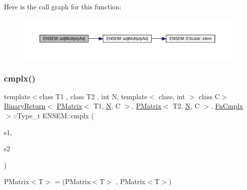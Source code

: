 Here is the call graph for this function\+:\nopagebreak
\begin{figure}[H]
\begin{center}
\leavevmode
\includegraphics[width=350pt]{df/d0a/group__primmatrix_ga81c788e54ea0f4c4de97e7bfa9d7cd89_cgraph}
\end{center}
\end{figure}
\mbox{\label{group__primmatrix_ga895c61e14c8d4206a949f44e36add5c6}} 
\subsubsection{\texorpdfstring{cmplx()}{cmplx()}}
{\footnotesize\ttfamily template$<$class T1 , class T2 , int N, template$<$ class, int $>$ class C$>$ \\
\mbox{\hyperlink{structENSEM_1_1BinaryReturn}{Binary\+Return}}$<$ \mbox{\hyperlink{classENSEM_1_1PMatrix}{P\+Matrix}}$<$ T1, \mbox{\hyperlink{adat__devel_2lib_2hadron_2operator__name__util_8cc_a7722c8ecbb62d99aee7ce68b1752f337}{N}}, C $>$, \mbox{\hyperlink{classENSEM_1_1PMatrix}{P\+Matrix}}$<$ T2, \mbox{\hyperlink{adat__devel_2lib_2hadron_2operator__name__util_8cc_a7722c8ecbb62d99aee7ce68b1752f337}{N}}, C $>$, \mbox{\hyperlink{structENSEM_1_1FnCmplx}{Fn\+Cmplx}} $>$\+::Type\+\_\+t E\+N\+S\+E\+M\+::cmplx (\begin{DoxyParamCaption}\item[{const \mbox{\hyperlink{classENSEM_1_1PMatrix}{P\+Matrix}}$<$ T1, \mbox{\hyperlink{adat__devel_2lib_2hadron_2operator__name__util_8cc_a7722c8ecbb62d99aee7ce68b1752f337}{N}}, C $>$ \&}]{s1,  }\item[{const \mbox{\hyperlink{classENSEM_1_1PMatrix}{P\+Matrix}}$<$ T2, \mbox{\hyperlink{adat__devel_2lib_2hadron_2operator__name__util_8cc_a7722c8ecbb62d99aee7ce68b1752f337}{N}}, C $>$ \&}]{s2 }\end{DoxyParamCaption})\hspace{0.3cm}{\ttfamily [inline]}}



P\+Matrix$<$\+T$>$ = (P\+Matrix$<$\+T$>$ , P\+Matrix$<$\+T$>$) 


